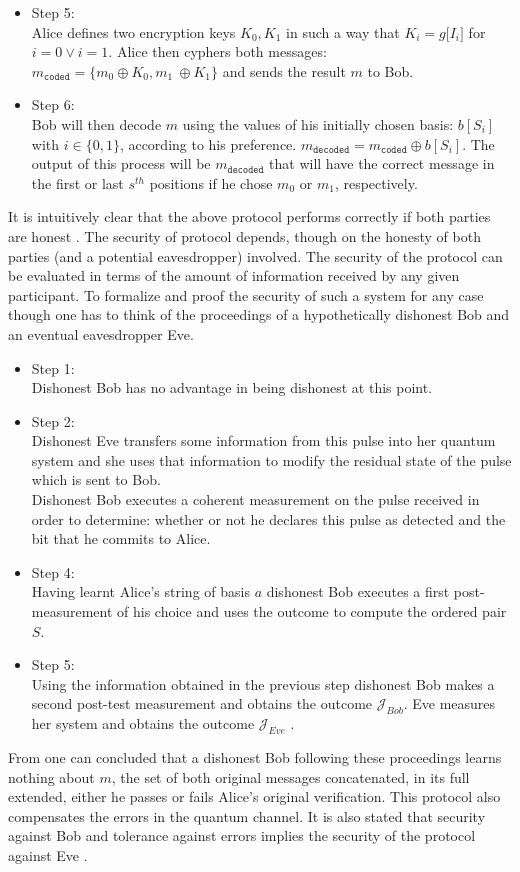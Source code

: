 \begin{refsection}
\begin{itemize}
		\item Step 5:\\
		Alice defines two encryption keys $K_0,K_1$ in such a way that $K_i=g\big[I_i\big]$ for $i=0 \vee i=1$. Alice then cyphers both messages: $m_{\mathtt{coded}}=\{m_0\oplus K_0,m_1\ \oplus K_1\}$ and sends the result $m$ to Bob.
		\item Step 6:\\
		Bob will then decode $m$ using the values of his initially chosen basis:  $b\left[S_i\right]$ with $i\in\{0,1\}$, according to his preference. $m_{\mathtt{decoded}}=m_{\mathtt{coded}}\oplus b\left[S_i\right]$. The output of this process will be $m_{\mathtt{decoded}}$ that will have the correct message in the first or last $s^{th}$ positions if he chose $m_0$ or $m_1$, respectively.
	\end{itemize}
	It is intuitively clear that the above protocol performs correctly if both parties are honest \cite{Yao1995}. The security of protocol depends, though on the honesty of both parties (and a potential eavesdropper) involved. The security of the protocol can be evaluated in terms of the amount of information received by any given participant. To formalize and proof the security of such a system for any case though one has to think of the proceedings of a hypothetically dishonest Bob and an eventual eavesdropper Eve.
	\begin{itemize}
		\item Step 1:\\
		Dishonest Bob has no advantage in being dishonest at this point.
		\item Step 2:\\
		Dishonest Eve transfers some information from this pulse into her quantum system and she uses that information to modify the residual state of the pulse which is sent to Bob.\\
		Dishonest Bob executes a coherent measurement on the pulse received in order to determine: whether or not he declares this pulse as detected and the bit that he commits to Alice.
		\item Step 4:\\
		Having learnt Alice's string of basis $a$ dishonest Bob executes a first post-measurement of his choice and uses the outcome to compute the ordered pair $S$.
		\item Step 5:\\ Using the information obtained in the previous step dishonest Bob makes a second post-test measurement and obtains the outcome $\mathcal{J}_{Bob}$. Eve measures her system and obtains the outcome $\mathcal{J}_{Eve}$ \cite{Mayers}.
	\end{itemize}
	From \cite{Mayers} one can concluded that a dishonest Bob following these proceedings learns nothing about $m$, the set of both original messages concatenated, in its full extended, either he passes or fails Alice's original verification. This protocol also compensates the errors in the quantum channel. It is also stated that security against Bob and tolerance against errors implies the security of the protocol against Eve \cite{Mayers}.
 


\end{refsection}
